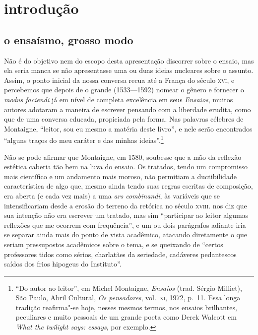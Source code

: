 
\chapter[Introdução, por Dirceu Villa]{introdução}

\section{o ensaísmo, grosso modo}

Não é do objetivo nem do escopo desta apresentação discorrer sobre o
ensaio, mas ela seria manca se não apresentasse uma ou duas ideias
nucleares sobre o assunto. Assim, o ponto inicial da nossa conversa
recua até a França do século \textsc{xvi}, e percebemos que depois de o grande	
 (1533---1592) nomear o gênero e fornecer o
\textit{modus faciendi} já em nível de completa excelência em seus
\textit{Ensaios}, muitos autores adotaram a maneira de escrever
pensando com a liberdade erudita, como que de uma conversa educada,
propiciada pela forma. Nas palavras célebres de Montaigne, “leitor, sou
eu mesmo a matéria deste livro”, e nele serão encontrados “alguns
traços do meu caráter e das minhas ideias”.\footnote{ “Do autor ao
leitor”, em Michel Montaigne, \textit{Ensaios} (trad.
Sérgio Milliet), São Paulo, Abril Cultural, \textit{Os
pensadores}, vol.~\textsc{xi}, 1972, p.~11. Essa longa tradição 
reafirma"-se hoje,
nesses mesmos termos, nos ensaios brilhantes, peculiares e muito
pessoais de um grande poeta como Derek Walcott em \textit{What the 
twilight says: essays}, por exemplo.}

Não se pode afirmar que Montaigne, em 1580, soubesse que a mão da
reflexão estética caberia tão bem na luva do ensaio. Os tratados, tendo
um compromisso mais científico e um andamento mais moroso, não
permitiam a ductibilidade característica de algo que, mesmo ainda tendo
suas regras escritas de composição, era aberta (e cada vez mais) a uma
\textit{ars combinandi}, às variáveis que se intensificariam desde a
erosão do terreno da retórica no século \textsc{xviii}.  nos diz que
sua intenção não era escrever um tratado, mas sim “participar ao leitor
algumas reflexões que me ocorrem com frequência”, e um ou dois
parágrafos adiante iria se separar ainda mais do ponto de vista
acadêmico, atacando diretamente o que seriam pressupostos acadêmicos
sobre o tema, e se queixando de “certos professores tidos como sérios,
charlatães da seriedade, cadáveres pedantescos saídos dos frios
hipogeus do Instituto”.

